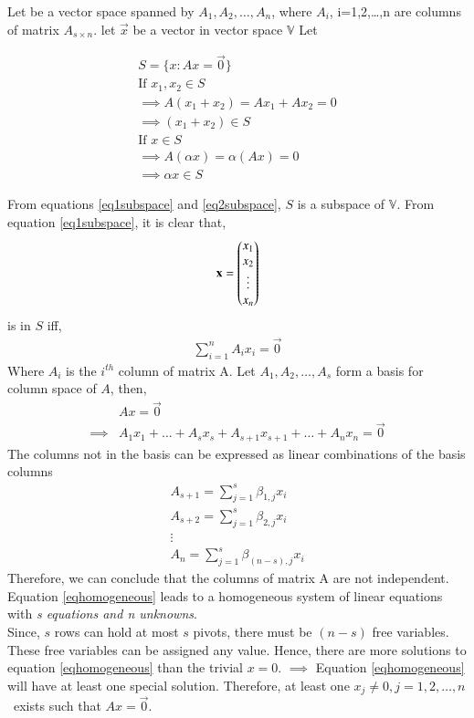 \documentclass[journal,12pt,twocolumn]{IEEEtran}
\begin{document}
Let  be a vector space spanned by $A_1,A_2,\dots,A_n$, where $A_i$, i=1,2,\dots,n are columns of matrix $A_{s\times n}$. let $\vec{x}$ be a vector in vector space $\mathbb{V}$\newline
Let
    \begin{multiline}
    \begin{align}
    S=\{x:Ax=\vec{0}\}\\
    \text{If } x_1,x_2 \in S\\
    \implies A(x_1+x_2)=Ax_1+Ax_2=0\\
    \implies (x_1+x_2)\in S \label{eq1subspace}\\
    \text{If } x \in S\\
    \implies A(\alpha x)=\alpha(Ax)=0\\
    \implies \alpha x\in S \label{eq2subspace}
    \end{align}
    \end{multiline}
From equations \eqref{eq1subspace} and \eqref{eq2subspace}, $S$ is a subspace of $\mathbb{V}$.\newline
From equation \eqref{eq1subspace}, it is clear that,
\begin{align}
    \mathbf{x}=\begin{pmatrix}x_1\\x_2\\\vdots\\x_n\end{pmatrix}
\end{align}
 is in $S$ iff,
 \begin{align}
    \sum_{i=1}^{n}A_ix_i = \vec{0}
 \end{align}
 Where $A_i$ is the $i^{th}$ column of matrix A.\newline
 Let $A_1,A_2,\dots,A_s$ form a basis for column space of $A$, then,
 \begin{align}
    &Ax=\vec{0}\\
    \implies &A_1x_1+\dots+A_sx_s+A_{s+1}x_{s+1}+\dots+A_nx_n=\vec{0}\label{eqhomogeneous}
 \end{align}
The columns not in the basis can be expressed as linear combinations of the basis columns
\begin{align}
    A_{s+1}=\sum_{j=1}^{s}\beta_{1,j}x_i\\
    A_{s+2}=\sum_{j=1}^{s}\beta_{2,j}x_i\\
    \vdots\\
    A_{n}=\sum_{j=1}^{s}\beta_{(n-s),j}x_i
\end{align}
Therefore, we can conclude that the columns of matrix A are not independent.\newline
Equation \eqref{eqhomogeneous} leads to a homogeneous system of linear equations with \textit{s equations and n unknowns}.\\
Since, $s$ rows can hold at most $s$ pivots, there must be $(n-s)$ free variables.\newline
These free variables can be assigned any value. Hence, there are more solutions to equation \eqref{eqhomogeneous} than the trivial $x=0$.\newline
$\implies$ Equation \eqref{eqhomogeneous} will have at least one special solution. \newline
Therefore, at least one $x_j\neq0, j=1,2,\dots,n$\ exists such that $Ax=\vec{0}$.
\end{document}

